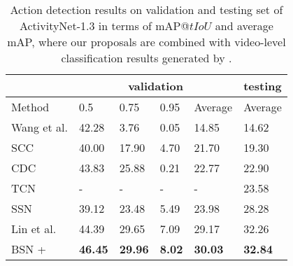 \documentclass[runningheads]{llncs}
\begin{document}
\begin{table}[tbp]
\setlength{\abovecaptionskip}{0.1cm} %
\centering
\caption{Action detection results on validation and testing set of ActivityNet-1.3 in terms of mAP@$tIoU$ and average mAP, where our proposals are combined with video-level classification results generated by \cite{zhao2017cuhk}.  }
\small
\begin{tabular}{p{2.8cm}p{1.4cm}<{\centering}p{1.4cm}<{\centering}p{1.4cm}<{\centering}p{1.5cm}<{\centering}p{1.6cm}<{\centering}}
\toprule
 & \multicolumn{4}{c}{validation} & testing  \\
\hline
Method  & 0.5  &  0.75  & 0.95  & Average  & Average  \\
\hline
Wang et al. \cite{wang2016uts}    & 42.28 & 3.76  & 0.05   & 14.85 & 14.62 \\
SCC \cite{heilbron2017scc}   & 40.00 & 17.90  & 4.70   & 21.70 & 19.30 \\
CDC \cite{shou2017cdc}    & 43.83  & 25.88  & 0.21   & 22.77  & 22.90 \\
TCN \cite{dai2017temporal} & - & - & - & - & 23.58\\
SSN \cite{xiong2017pursuit}    & 39.12 & 23.48  & 5.49  & 23.98 & 28.28 \\
Lin et al. \cite{lin2017temporal} & 44.39   & 29.65  & 7.09  & 29.17 & 32.26 \\
\hline
BSN + \cite{zhao2017cuhk} & {\bf 46.45 }   & {\bf 29.96}  & {\bf 8.02}  & {\bf 30.03 } & {\bf 32.84 } \\
\bottomrule
\end{tabular}
\label{table_detection_anet}
\normalsize
\vspace{-0.1cm}
\end{table}
\end{document}
